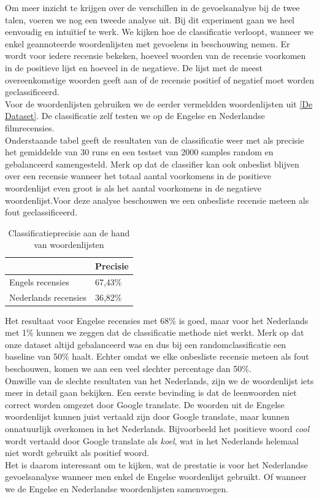 Om meer inzicht te krijgen over de verschillen in de gevoelsanalyse bij de twee talen, voeren we nog een tweede analyse uit. Bij dit experiment gaan we heel eenvoudig en intu\"itief te werk. We kijken hoe de classificatie verloopt, wanneer we enkel geannoteerde woordenlijsten met gevoelens in beschouwing nemen. Er wordt voor iedere recensie bekeken, hoeveel woorden van de recensie voorkomen in de positieve lijst en hoeveel in de negatieve. De lijst met de meest overeenkomstige woorden geeft aan of de recensie positief of negatief moet worden geclassificeerd.\\
Voor de woordenlijsten gebruiken we de eerder vermeldden woordenlijsten uit \ref{De Dataset}. De classificatie zelf testen we op de Engelse en Nederlandse filmrecensies.\\
Onderstaande tabel geeft de resultaten van de classificatie weer met als precisie het gemiddelde van 30 runs en een testset van 2000 samples random en gebalanceerd samengesteld. Merk op dat de classifier kan ook onbeslist blijven over een recensie wanneer het totaal aantal voorkomens in de positieve woordenlijst even groot is als het aantal voorkomens in de negatieve woordenlijst.Voor deze analyse beschouwen we een onbesliste recensie meteen als fout geclassificeerd.

\begin{table}[h]
\centering
\begin{tabular}{l|l|}
\cline{2-2}
                                           & Precisie \\ \hline
\multicolumn{1}{|l|}{Engels recensies}     & 67,43\%  \\ \hline
\multicolumn{1}{|l|}{Nederlands recensies} & 36,82\%   \\ \hline
\end{tabular}
\caption{Classificatieprecisie aan de hand van woordenlijsten}
\end{table}

 Het resultaat voor Engelse recensies met 68\% is goed, maar voor het Nederlands met 1\% kunnen we zeggen dat de classificatie methode niet werkt. Merk op dat onze dataset altijd gebalanceerd was en dus bij een randomclassificatie een baseline van 50\% haalt. Echter omdat we elke onbesliste recensie meteen als fout beschouwen, komen we aan een veel slechter percentage dan 50\%.\\
 Omwille van de slechte resultaten van het Nederlands, zijn we de woordenlijst iets meer in detail gaan bekijken. Een eerste bevinding is dat de leenwoorden niet correct worden omgezet door Google translate. De woorden uit de Engelse woordenlijst kunnen juist vertaald zijn door Google translate, maar kunnen onnatuurlijk overkomen in het Nederlands. Bijvoorbeeld het positieve woord \textit{cool} wordt vertaald door Google translate als \textit{koel}, wat in het Nederlands helemaal niet wordt gebruikt als positief woord.\\
 Het is daarom interessant om te kijken, wat de prestatie is voor het Nederlandse gevoelsanalyse wanneer men enkel de Engelse woordenlijst gebruikt. Of wanneer we de Engelse en Nederlandse woordenlijsten samenvoegen.

